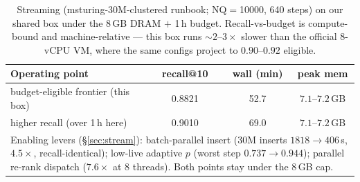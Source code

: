 \documentclass{article}
\begin{document}
\begin{table}[t]
\centering
\caption{Tree geometry and per-query routing cost (Eq.~\ref{eq:route}) by scale.
Beams are aggressive ($b_0\!\approx\!3$--$25\%$ of coarse cells) because OOD queries
route poorly. The 100M geometry is validated by a direct fine-vs-coarse $K_f$ A/B at 100M,
not read off the 2-level scaling law (\S\ref{sec:scaling}); the cost model
(\S\ref{sec:routecost}) motivates its third level.}
\label{tab:geom}
\end{table}

\begin{table}[t]
\centering
\caption{Streaming (msturing-30M-clustered runbook; NQ$=$10000, 640 steps) on our
shared box under the 8\,GB DRAM $+$ 1\,h budget. Recall-vs-budget is compute-bound and
machine-relative --- this box runs ${\sim}2$--$3\times$ slower than the official 8-vCPU VM,
where the same configs project to $0.90$--$0.92$ eligible.}
\label{tab:streaming}
\begin{tabular}{lccc}
\toprule
Operating point & recall@10 & wall (min) & peak mem \\
\midrule
budget-eligible frontier (this box) & 0.8821 & 52.7 & $7.1$--$7.2$\,GB \\
higher recall (over 1\,h here)       & 0.9010 & 69.0 & $7.1$--$7.2$\,GB \\
\bottomrule
\multicolumn{4}{p{0.92\linewidth}}{\footnotesize Enabling levers (\S\ref{sec:stream}):
batch-parallel insert (30M inserts $1818\!\to\!406$\,s, $4.5\times$, recall-identical);
low-live adaptive $p$ (worst step $0.737\!\to\!0.944$); parallel re-rank dispatch
($7.6\times$ at 8 threads). Both points stay under the 8\,GB cap.}
\end{tabular}
\end{table}
\end{document}
